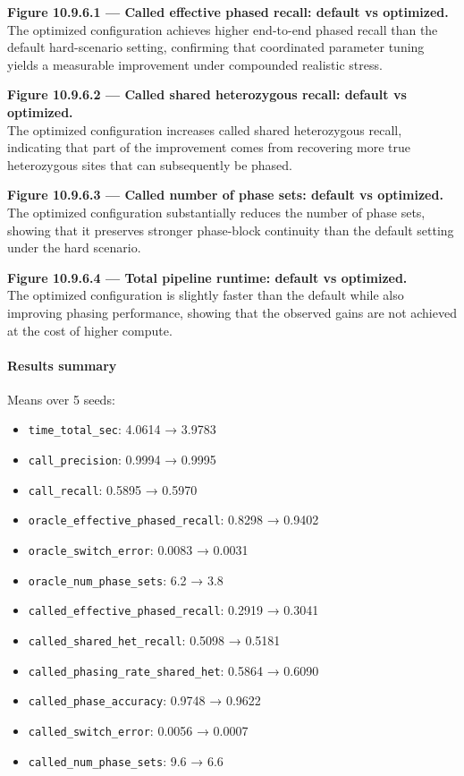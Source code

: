 \documentclass[
]{article}
\providecommand{\tightlist}{%
  \setlength{\itemsep}{0pt}\setlength{\parskip}{0pt}}
\begin{document}
\textbf{Figure 10.9.6.1 --- Called effective phased recall: default vs
optimized.}\\
The optimized configuration achieves higher end-to-end phased recall
than the default hard-scenario setting, confirming that coordinated
parameter tuning yields a measurable improvement under compounded
realistic stress.

\textbf{Figure 10.9.6.2 --- Called shared heterozygous recall: default
vs optimized.}\\
The optimized configuration increases called shared heterozygous recall,
indicating that part of the improvement comes from recovering more true
heterozygous sites that can subsequently be phased.

\textbf{Figure 10.9.6.3 --- Called number of phase sets: default vs
optimized.}\\
The optimized configuration substantially reduces the number of phase
sets, showing that it preserves stronger phase-block continuity than the
default setting under the hard scenario.

\textbf{Figure 10.9.6.4 --- Total pipeline runtime: default vs
optimized.}\\
The optimized configuration is slightly faster than the default while
also improving phasing performance, showing that the observed gains are
not achieved at the cost of higher compute.

\paragraph{Results summary}\label{results-summary-5}

Means over 5 seeds:

\begin{itemize}
\tightlist
\item
  \texttt{time\_total\_sec}: 4.0614 → 3.9783
\item
  \texttt{call\_precision}: 0.9994 → 0.9995
\item
  \texttt{call\_recall}: 0.5895 → 0.5970
\item
  \texttt{oracle\_effective\_phased\_recall}: 0.8298 → 0.9402
\item
  \texttt{oracle\_switch\_error}: 0.0083 → 0.0031
\item
  \texttt{oracle\_num\_phase\_sets}: 6.2 → 3.8
\item
  \texttt{called\_effective\_phased\_recall}: 0.2919 → 0.3041
\item
  \texttt{called\_shared\_het\_recall}: 0.5098 → 0.5181
\item
  \texttt{called\_phasing\_rate\_shared\_het}: 0.5864 → 0.6090
\item
  \texttt{called\_phase\_accuracy}: 0.9748 → 0.9622
\item
  \texttt{called\_switch\_error}: 0.0056 → 0.0007
\item
  \texttt{called\_num\_phase\_sets}: 9.6 → 6.6
\end{itemize}
\end{document}
